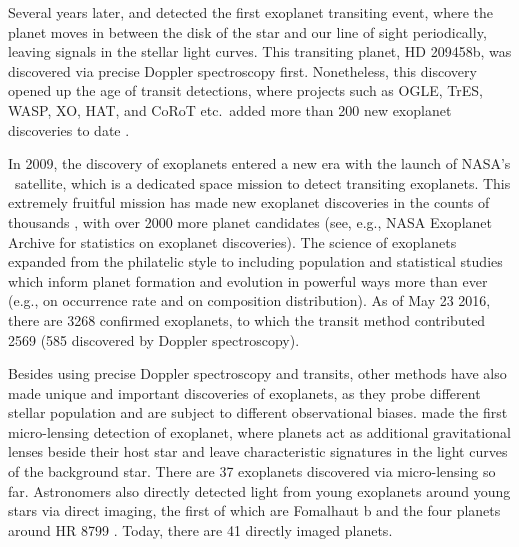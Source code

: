 Several years later, \cite{2000ApJ...529L..41H} and
\cite{2000ApJ...529L..45C} detected the first exoplanet transiting
event, where the planet moves in between the disk of the star and our
line of sight periodically, leaving signals in the stellar light
curves. This transiting planet, HD 209458b, was discovered via
precise Doppler spectroscopy first. Nonetheless, this discovery opened
up the age of transit detections, where projects such as OGLE, TrES,
WASP, XO, HAT, and CoRoT etc.\ added more than 200 new exoplanet
discoveries to date \citep{2003Natur.421..507K, 2004ApJ...613L.153A,
2006MNRAS.372.1117C, 2006ApJ...648.1228M, 2007ApJ...656..552B}.

In 2009, the discovery of exoplanets entered a new era with the launch
of NASA's \kepler\ satellite, which is a dedicated space mission to
detect transiting exoplanets. This extremely fruitful mission has made
new exoplanet discoveries in the counts of thousands
\citep{2014ApJ...784...45R, 2016ApJ...822...86M}, with over 2000 more
planet candidates (see, e.g., NASA Exoplanet Archive for statistics on
exoplanet discoveries). The science of exoplanets expanded from the
philatelic style to including population and statistical studies which
inform planet formation and evolution in powerful ways more than ever
(e.g., \citealt{2013ApJ...766...81F} on occurrence rate and
\citealt{wolfgang2015b} on composition distribution). As of May
23 2016, there are 3268 confirmed exoplanets, to which the transit
method contributed 2569 (585 discovered by Doppler spectroscopy).

Besides using precise Doppler spectroscopy and transits, other methods
have also made unique and important discoveries of exoplanets, as they
probe different stellar population and are subject to different
observational biases. \cite{2004ApJ...606L.155B} made the first
micro-lensing detection of exoplanet, where planets act as additional
gravitational lenses beside their host star and leave characteristic
signatures in the light curves of the background star. There are 37
exoplanets discovered via micro-lensing so far. Astronomers also
directly detected light from young exoplanets around young stars via
direct imaging, the first of which are Fomalhaut b
\citep{2008Sci...322.1345K} and the four planets around HR 8799
\citep{2008Sci...322.1348M}. Today, there are 41 directly imaged
planets.

